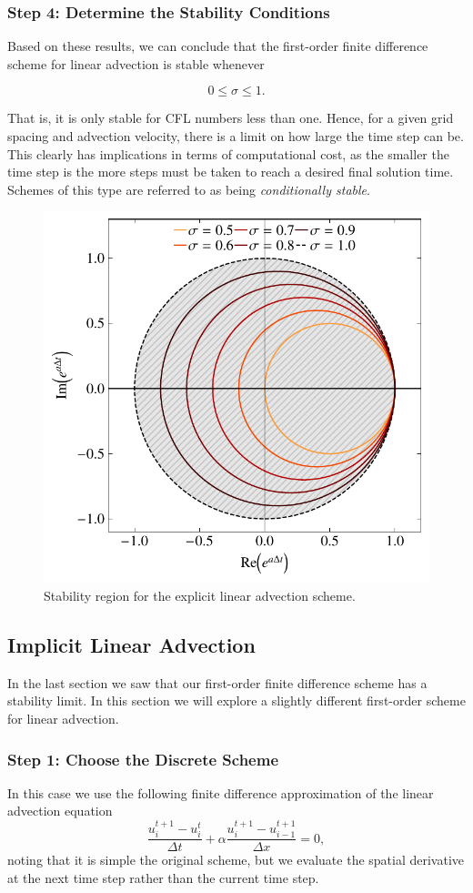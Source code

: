 \subsubsection{Step 4: Determine the Stability Conditions}
Based on these results, we can conclude that the first-order finite difference scheme for linear advection is stable whenever
\begin{eqBox}
\begin{equation}
	0 \leq \sigma \leq 1.
\end{equation}
\end{eqBox}
That is, it is only stable for CFL numbers less than one. Hence, for a given grid spacing and advection velocity, there is a limit on how large the time step can be. This clearly has implications in terms of computational cost, as the smaller the time step is the more steps must be taken to reach a desired final solution time. Schemes of this type are referred to as being {\it conditionally stable}.


\begin{figure}[htbp]
	\centering
	\includegraphics[width=0.6\linewidth]{Pictures/explicit_advection}
	\caption{Stability region for the explicit linear advection scheme.}
	\label{fig:explicit_advection}
\end{figure}

\subsection{Implicit Linear Advection}
In the last section we saw that our first-order finite difference scheme has a stability limit. In this section we will explore a slightly different first-order scheme for linear advection.

\subsubsection{Step 1: Choose the Discrete Scheme}
In this case we use the following finite difference approximation of the linear advection equation
\begin{equation}
	\frac{u_i^{t+1} - u_{i}^t}{\Delta t} +  \alpha \frac{u_i^{t+1} - u_{i-1}^{t+1}}{\Delta x} = 0,
\end{equation}
noting that it is simple the original scheme, but we evaluate the spatial derivative at the next time step rather than the current time step.

